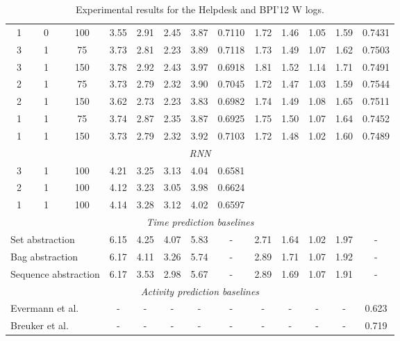 \documentclass[runningheads,a4paper]{llncs}
\begin{document}
\begin{table}[t]
\begin{tabular}{c@{\quad}c@{\quad}cccccc@{\quad}ccccc}
		1 & 0 & 100 & 3.55 & 2.91 & 2.45 & 3.87 & 0.7110 & 1.72 & 1.46 & 1.05 & 1.59 & 0.7431  
		\vspace{0.1cm}
		\\	
		3 & 1 & 75 & 3.73 & 2.81 & 2.23 & 3.89 & 0.7118 & 1.73 & 1.49 & 1.07 & 1.62 & 0.7503\\
		3 & 1 & 150 & 3.78 & 2.92 & 2.43 & 3.97 & 0.6918 & 1.81 & 1.52 & 1.14 & 1.71 & 0.7491\\
		2 & 1 & 75 & 3.73 & 2.79 & 2.32 & 3.90 & 0.7045 & 1.72 & 1.47 & 1.03 & 1.59 & 0.7544\\
		2 & 1 & 150 & 3.62 & 2.73 & 2.23 & 3.83 & 0.6982 & 1.74 & 1.49 & 1.08 & 1.65 & 0.7511\\
		1 & 1 & 75 & 3.74 & 2.87 & 2.35 & 3.87 & 0.6925 & 1.75 & 1.50 & 1.07 & 1.64 & 0.7452\\
		1 & 1 & 150 & 3.73 & 2.79 & 2.32 & 3.92 & 0.7103 & 1.72 & 1.48 & 1.02 & 1.60 & 0.7489\\
		\multicolumn{13}{c}{\rule{0pt}{3ex} \emph{RNN}} \\
		3 & 1 & 100 & 4.21 & 3.25 & 3.13 & 4.04 & 0.6581 & & & & &\\
		2 & 1 & 100 & 4.12 & 3.23 & 3.05 & 3.98 & 0.6624 & & & & &\\
		1 & 1 & 100 & 4.14 & 3.28 & 3.12 & 4.02 & 0.6597 & & & & &\\
		\multicolumn{13}{c}{\rule{0pt}{3ex} \emph{Time prediction baselines}} \\
		\multicolumn{3}{l}{Set abstraction \cite{Aalst2011}} & 6.15 & 4.25 & 4.07 & 5.83 & - & 2.71 & 1.64 & 1.02 & 1.97 & -\\ 
		\multicolumn{3}{l}{Bag abstraction \cite{Aalst2011}} & 6.17 & 4.11 & 3.26 & 5.74 & -& 2.89&1.71 &1.07 &1.92 & -\\
		\multicolumn{3}{l}{Sequence abstraction \cite{Aalst2011}} & 6.17 & 3.53 & 2.98 & 5.67 & -& 2.89&1.69 &1.07 &1.91 &-\\
		\multicolumn{13}{c}{\rule{0pt}{3ex}  \emph{Activity prediction baselines}}\\
		\multicolumn{3}{l}{Evermann et al. \cite{Evermann2016}} & - & - & - & - & - & - & - & - & - & 0.623\\
		\multicolumn{3}{l}{Breuker et al. \cite{Breuker2016}} & - & - & - & - & - & - & - & - & - & 0.719\\
\bottomrule
	\end{tabular}
	\caption{Experimental results for the Helpdesk and BPI'12 W logs.}
	\label{tab:helpdesk_1_lstm}
	\vspace{-0.5cm}
\end{table}
\end{document}
